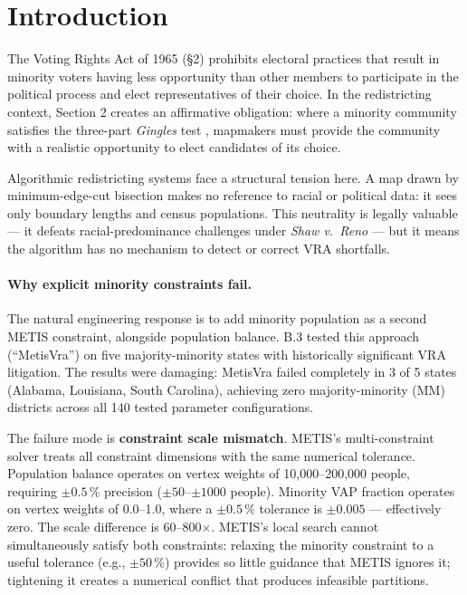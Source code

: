 \section{Introduction}
\label{sec:intro}

The Voting Rights Act of 1965 (\S 2) prohibits electoral practices that
result in minority voters having less opportunity than other members to
participate in the political process and elect representatives of their
choice.
In the redistricting context, Section 2 creates an affirmative obligation:
where a minority community satisfies the three-part \emph{Gingles} test
\citep{gingles1986}, mapmakers must provide the community with a realistic
opportunity to elect candidates of its choice.

Algorithmic redistricting systems face a structural tension here.
A map drawn by minimum-edge-cut bisection makes no reference to racial
or political data: it sees only boundary lengths and census populations.
This neutrality is legally valuable --- it defeats racial-predominance challenges
under \emph{Shaw v.\ Reno} \citep{shaw1993} --- but it means the algorithm
has no mechanism to detect or correct VRA shortfalls.

\paragraph{Why explicit minority constraints fail.}
The natural engineering response is to add minority population as a second
METIS constraint, alongside population balance.
B.3 \citep{b3paper} tested this approach (``MetisVra'') on five
majority-minority states with historically significant VRA litigation.
The results were damaging: MetisVra failed completely in 3 of 5 states
(Alabama, Louisiana, South Carolina), achieving zero majority-minority
(MM) districts across all 140 tested parameter configurations.

The failure mode is \textbf{constraint scale mismatch}.
METIS's multi-constraint solver treats all constraint dimensions with
the same numerical tolerance.
Population balance operates on vertex weights of 10,000--200,000 people,
requiring $\pm 0.5\,\%$ precision ($\pm 50$--$\pm 1000$ people).
Minority VAP fraction operates on vertex weights of 0.0--1.0, where
a $\pm 0.5\,\%$ tolerance is $\pm 0.005$ --- effectively zero.
The scale difference is 60--800$\times$.
METIS's local search cannot simultaneously satisfy both constraints:
relaxing the minority constraint to a useful tolerance (e.g., $\pm 50\,\%$)
provides so little guidance that METIS ignores it; tightening it creates
a numerical conflict that produces infeasible partitions.

